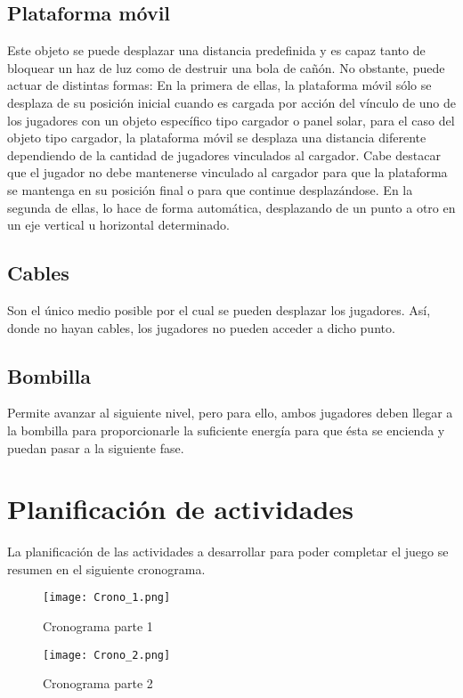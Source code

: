\documentclass{article}
\begin{document}
\subsection{Plataforma móvil}
Este objeto se puede desplazar una distancia predefinida y es capaz tanto de bloquear un haz de luz como de destruir una bola de cañón. No obstante, puede actuar de distintas formas: 
En la primera de ellas, la plataforma móvil sólo se desplaza de su posición inicial cuando es cargada por acción del vínculo de uno de los jugadores con un objeto específico tipo cargador o panel solar, para el caso del objeto tipo cargador, la plataforma móvil se desplaza una distancia diferente dependiendo de la cantidad de jugadores vinculados al cargador. Cabe destacar que el jugador no debe mantenerse vinculado al cargador para que la plataforma se mantenga en su posición final o para que continue desplazándose.
En la segunda de ellas, lo hace de forma automática, desplazando de un punto a otro en un eje vertical u horizontal determinado.
\subsection{Cables}
Son el único medio posible por el cual se pueden desplazar los jugadores. Así, donde no hayan cables, los jugadores no pueden acceder a dicho punto.
\subsection{Bombilla}
Permite avanzar al siguiente nivel, pero para ello, ambos jugadores deben llegar a la bombilla para proporcionarle la suficiente energía para que ésta se encienda y puedan pasar a la siguiente fase.
\section{Planificación de actividades}
La planificación de las actividades a desarrollar para poder completar el juego se resumen en el siguiente cronograma.
\begin{figure}[h]
    \centering
    \texttt{[image: Crono\_1.png]}
    \caption{Cronograma parte 1}
    \label{fig:crono_1}
\end{figure}
\begin{figure}[h]
    \centering
    \texttt{[image: Crono\_2.png]}
    \caption{Cronograma parte 2}
    \label{fig:crono_2}
\end{figure}


\end{document}
